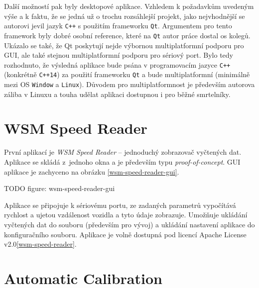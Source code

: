 Další možností pak byly desktopové aplikace. Vzhledem k požadavkům uvedeným
výše a k faktu, že se jedná už o trochu rozsáhlejší projekt, jako nejvhodnější
se autorovi jevil jazyk \texttt{C++} s použitím frameworku \texttt{Qt}.
Argumentem pro tento framework byly dobré osobní reference, které na
\texttt{Qt} autor práce dostal os kolegů. Ukázalo se také, že Qt poskytují
nejde výbornou multiplatformní podporu pro GUI, ale také stejnou
multiplatformní podporu pro sériový port. Bylo tedy rozhodnuto, že výsledná
aplikace bude psána v programovacím jazyce \texttt{C++} (konkrétně
\texttt{C++14}) za použití frameworku \texttt{Qt} a bude multiplatformní
(minimálně mezi OS \texttt{Window} a \texttt{Linux}). Důvodem pro
multiplatformnost je především autorova záliba v Linuxu a touha udělat aplikaci
dostupnou i pro běžné smrtelníky.

\section{WSM Speed Reader}

První aplikací je \textit{WSM Speed Reader} -- jednoduchý zobrazovač vyčtených
dat. Aplikace se skládá z~jednoho okna a je především typu
\textit{proof-of-concept}. GUI aplikace je zachyceno na obrázku
\ref{wsm-speed-reader-gui}.

TODO figure: wsm-speed-reader-gui

Aplikace se připojuje k sériovému portu, ze zadaných parametrů vypočítává
rychlost a ujetou vzdálenost vozidla a tyto údaje zobrazuje. Umožňuje ukládání
vyčtených dat do souboru (především pro vývoj) a ukládání nastavení aplikace
do konfiguračního souboru. Aplikace je volně dostupná pod licencí Apache
License v2.0\ref{wsm-speed-reader}.

\section{Automatic Calibration}

